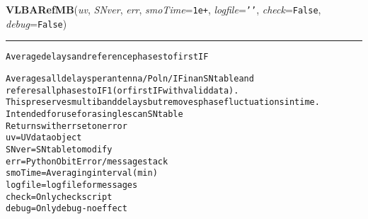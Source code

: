     \begin{boxedminipage}{\textwidth}

    \raggedright \textbf{VLBARefMB}(\textit{uv}, \textit{SNver}, \textit{err}, \textit{smoTime}=\texttt{1\-e\-+\-}, \textit{logfile}=\texttt{'\-'\-}, \textit{check}=\texttt{F\-a\-l\-s\-e\-}, \textit{debug}=\texttt{F\-a\-l\-s\-e\-})

    \vspace{-1.5ex}

    \rule{\textwidth}{0.5\fboxrule}
\begin{alltt}
Average delays and reference phases to first IF

Averages all delays per antenna/Poln/IF in an SN table and 
referes all phases to IF 1 (or first IF with valid data).
This preserves multiband delays but removes phase fluctuations in time.
Intended for use for a single scan SN table
Returns with err set on error
uv         = UV data object
SNver      = SN table to modify
err        = Python Obit Error/message stack
smoTime    = Averaging interval (min)
logfile    = logfile for messages
check      = Only check script
debug      = Only debug - no effect\end{alltt}

    \vspace{1ex}

    \end{boxedminipage}

    \label{VLBACal:VLBARLCal}
    \vspace{0.5ex}

